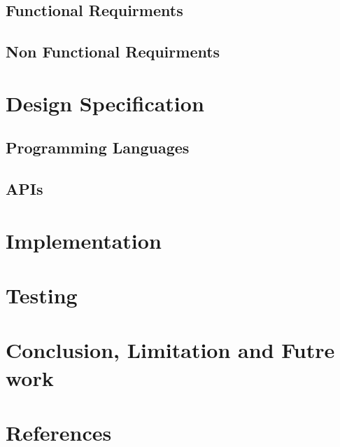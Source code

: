 \documentclass[12pt]{report}
\begin{document}
\section{Functional Requirments}
\section{Non Functional Requirments}
\chapter{Design Specification}
\section{Programming Languages}
\section{APIs}
\chapter{Implementation}

\chapter{Testing}
\chapter{Conclusion, Limitation and Futre work}
\chapter{References}
\end{document}
